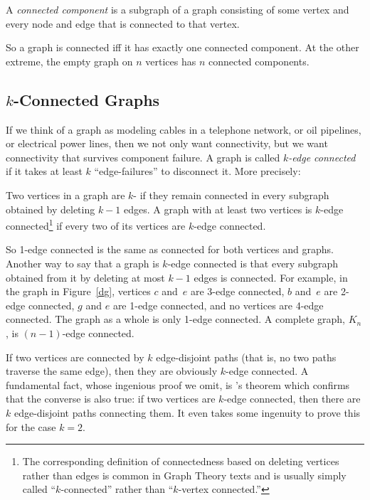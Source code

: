 \begin{definition}\label{def:connected-component}
A \emph{connected component} is a subgraph of a graph consisting of
some vertex and every node and edge that is connected to that vertex.
\end{definition}

So a graph is connected iff it has exactly one connected component.
At the other extreme, the empty graph on $n$ vertices has $n$
connected components.

\subsection{$k$-Connected Graphs}

If we think of a graph as modeling cables in a telephone network, or
oil pipelines, or electrical power lines, then we not only want
connectivity, but we want connectivity that survives component
failure.  A graph is called \emph{$k$-edge connected} if it takes at
least $k$ ``edge-failures'' to disconnect it.  More precisely:

\begin{definition}
  Two vertices in a graph are $k$- if they remain
  connected in every subgraph obtained by deleting $k-1$ edges.  A graph
  with at least two vertices is $k$-edge connected\footnote{The
    corresponding definition of connectedness based on deleting vertices
    rather than edges is common in Graph Theory texts and is usually
    simply called ``$k$-connected'' rather than ``$k$-vertex connected.''}
  if every two of its vertices are $k$-edge connected.
\end{definition}

So 1-edge connected is the same as connected for both vertices and
graphs.  Another way to say that a graph is $k$-edge connected is
that every subgraph obtained from it by deleting at most $k-1$ edges
is connected.  For example, in the graph in Figure~\ref{dg},
vertices $c$ and~$e$ are 3-edge connected, $b$ and~$e$ are 2-edge
connected, $g$ and $e$ are 1-edge connected, and no vertices are
4-edge connected.  The graph as a whole is only 1-edge connected.
A complete graph, $K_n$, is $(n-1)$-edge connected.

If two vertices are connected by $k$ edge-disjoint paths (that is, no
two paths traverse the same edge), then they are obviously $k$-edge
connected.  A fundamental fact, whose ingenious proof we omit,
is 's theorem which confirms that the converse is also
true: if two vertices are $k$-edge connected, then there are $k$
edge-disjoint paths connecting them.  It even takes some ingenuity to
prove this for the case $k=2$.

